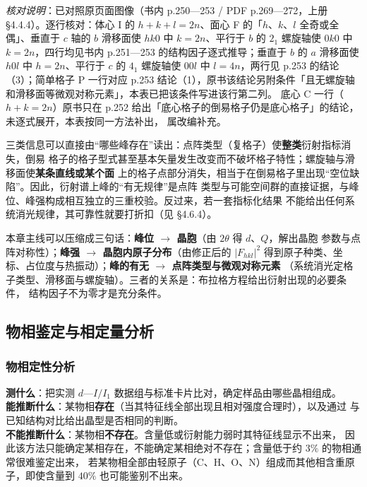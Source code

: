 \emph{核对说明}：已对照原页面图像（书内 p.250—253 / PDF p.269—272，上册 §4.4.4）。逐行核对：体心 I 的 $h+k+l=2n$、面心 F 的「$h$、$k$、$l$ 全奇或全偶」、垂直于 $c$
轴的 $b$ 滑移面使 $hk0$ 中 $k=2n$、平行于 $b$ 的 $2_{1}$ 螺旋轴使 $0k0$ 中
$k=2n$，四行均见书内 p.251—253 的结构因子逐式推导；垂直于 $b$ 的 $a$ 滑移面使 $h0l$
中 $h=2n$、平行于 $c$ 的 $4_{1}$ 螺旋轴使 $00l$ 中 $l=4n$，两行见 p.253 的结论（3）；简单格子 P 一行对应 p.253 结论（1），原书该结论另附条件「且无螺旋轴和滑移面等微观对称元素」，本表已把该条件写进该行第二列。
底心 C 一行（$h+k=2n$）原书只在 p.252 给出「底心格子的倒易格子仍是底心格子」的结论，未逐式展开，本表按同一方法补出，
属改编补充。


\begin{keycond}
三类信息可以直接由“哪些峰存在”读出：点阵类型（复格子）使\textbf{整类}衍射指标消失，倒易
格子的格子型式甚至基本矢量发生改变而不破坏格子特性；螺旋轴与滑移面使\textbf{某条直线或某个面}
上的格子点部分消失，相当于在倒易格子里出现“空位缺陷”。因此，衍射谱上峰的“有无规律”是点阵
类型与可能空间群的直接证据，与峰位、峰强构成相互独立的三重校验。反过来，若一套指标化结果
不能给出任何系统消光规律，其可靠性就要打折扣（见 §4.6.4）。
\end{keycond}

\begin{methodsum}
本章主线可以压缩成三句话：\textbf{峰位 $\rightarrow$ 晶胞}（由 $2\theta$ 得 $d$、$Q$，解出晶胞
参数与点阵对称性）；\textbf{峰强 $\rightarrow$ 晶胞内原子分布}（由修正后的 $\left|F_{hkl}\right|^{2}$
得到原子种类、坐标、占位度与热振动）；\textbf{峰的有无 $\rightarrow$ 点阵类型与微观对称元素}
（系统消光定格子类型、滑移面与螺旋轴）。三者的关系是：布拉格方程给出衍射出现的必要条件，
结构因子不为零才是充分条件。
\end{methodsum}

\subsection{物相鉴定与相定量分析}

\subsubsection{物相定性分析}

\begin{probout}
\textbf{测什么}：把实测 $d$—$I/I_{1}$ 数据组与标准卡片比对，确定样品由哪些晶相组成。\\
\textbf{能推断什么}：某物相\textbf{存在}（当其特征线全部出现且相对强度合理时），以及通过
与已知结构对比给出晶型是否相同的判断。\\
\textbf{不能推断什么}：某物相\textbf{不存在}。含量低或衍射能力弱时其特征线显示不出来，
因此该方法只能确定某相存在，不能确定某相绝对不存在；含量低于约 $3\%$ 的物相通常很难鉴定出来，
若某物相全部由轻原子（C、H、O、N）组成而其他相含重原子，即使含量到 $40\%$ 也可能鉴别不出来。
\end{probout}

